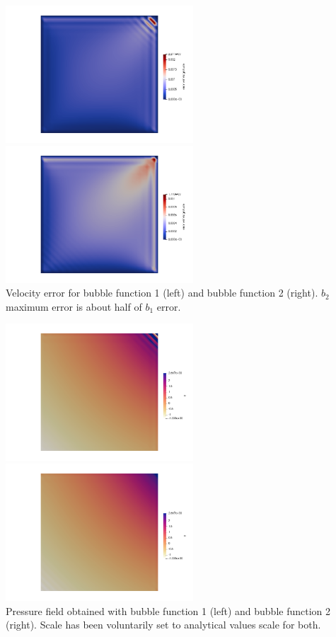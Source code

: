 \begin{center}
\includegraphics[width=7cm]{python_codes/fieldstone_72/results/mms2/error_v1}
\includegraphics[width=7cm]{python_codes/fieldstone_72/results/mms2/error_v2}\\
{\captionfont Velocity error for bubble function 1 (left) and bubble function 2 (right). 
$b_2$ maximum error is about half of $b_1$ error.}
\end{center}

\begin{center}
\includegraphics[width=7cm]{python_codes/fieldstone_72/results/mms2/p1}
\includegraphics[width=7cm]{python_codes/fieldstone_72/results/mms2/p2}\\
{\captionfont Pressure field obtained with bubble function 1 (left) and bubble function 2 (right).
Scale has been voluntarily set to analytical values scale for both.}
\end{center}

